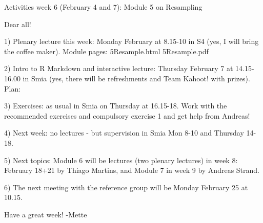 Activities week 6 (February 4 and 7): Module 5 on Resampling

Dear all!

1) Plenary lecture this week: Monday February at 8.15-10 in S4 (yes, I will bring the coffee maker). Module pages: 5Resample.html 5Resample.pdf

2) Intro to R Markdown and interactive lecture: Thursday February 7 at 14.15-16.00 in Smia (yes, there will be refreshments and Team Kahoot! with prizes). Plan:

3) Exercises: as usual in Smia on Thursday at 16.15-18. Work with the recommended exercises and compulsory exercise 1 and get help from Andreas!

4) Next week: no lectures - but supervision in Smia Mon 8-10 and Thursday 14-18. 

5) Next topics: Module 6 will be lectures (two plenary lectures) in week 8: February 18+21 by Thiago Martins, and Module 7 in week 9 by Andreas Strand. 

6) The next meeting with the reference group will be Monday February 25 at 10.15.

Have a great week!
-Mette